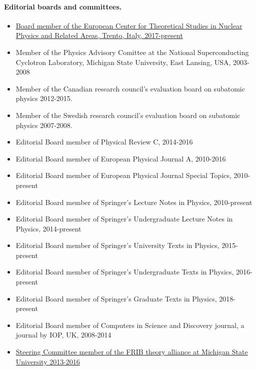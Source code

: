\documentclass[%
oneside,                 %
final,                   %
10pt]{article}
\begin{document}
\noindent
\paragraph{Editorial boards and committees.}
\begin{itemize}
\item \href{{http://ectstar.eu/}}{Board member of the European Center for Theoretical Studies in Nuclear Physics and Related Areas, Trento, Italy, 2017-present}

\item Member of the Physics Advisory Comittee at the National Superconducting Cyclotron Laboratory, Michigan State University, East Lansing, USA, 2003-2008

\item Member of the Canadian research council's evaluation board on subatomic physics 2012-2015.

\item Member of the Swedish research council's evaluation board on subatomic physics 2007-2008.

\item Editorial Board member of Physical Review C, 2014-2016

\item Editorial Board member of European Physical Journal A, 2010-2016

\item Editorial Board member of European Physical Journal Special Topics, 2010-present

\item Editorial Board member of Springer's Lecture Notes in Physics, 2010-present

\item Editorial Board member of Springer's Undergraduate Lecture Notes in Physics, 2014-present

\item Editorial Board member of Springer's University Texts  in Physics, 2015-present

\item Editorial Board member of Springer's Undergraduate Texts  in Physics, 2016-present

\item Editorial Board member of Springer's Graduate Texts  in Physics, 2018-present

\item Editorial Board member of Computers in Science and Discovery journal, a journal by IOP, UK, 2008-2014

\item \href{{http://fribtheoryalliance.org/}}{Steering Committee member of the FRIB theory alliance at Michigan State University 2013-2016}


\end{itemize}
\end{document}
